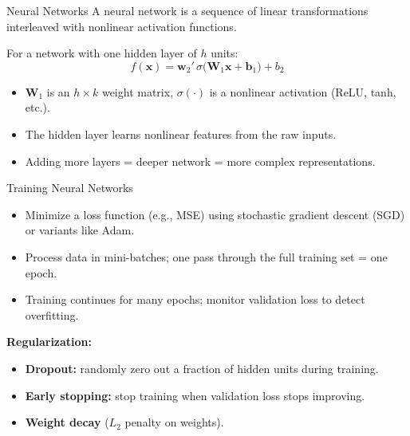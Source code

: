 \documentclass[aspectratio=169,t]{beamer}
\begin{document}
\begin{frame}{Neural Networks}
A neural network is a sequence of linear transformations interleaved with nonlinear \alert{activation functions}.
\vspace{0.3cm}

For a network with one hidden layer of $h$ units:
\[
f(\mathbf{x}) = \mathbf{w}_2' \,\sigma\!\bigl(\mathbf{W}_1 \mathbf{x} + \mathbf{b}_1\bigr) + b_2
\]

\begin{itemize}
\item $\mathbf{W}_1$ is an $h \times k$ weight matrix, $\sigma(\cdot)$ is a nonlinear activation (ReLU, tanh, etc.).
\item The hidden layer learns \alert{nonlinear features} from the raw inputs.
\item Adding more layers = deeper network = more complex representations.
\end{itemize}
\end{frame}

\begin{frame}{Training Neural Networks}
\begin{itemize}
\item Minimize a loss function (e.g., MSE) using \alert{stochastic gradient descent} (SGD) or variants like Adam.
\item Process data in \alert{mini-batches}; one pass through the full training set = one \alert{epoch}.
\item Training continues for many epochs; monitor validation loss to detect overfitting.
\end{itemize}

\vspace{0.3cm}
\textbf{Regularization:}
\begin{itemize}
\item \textbf{Dropout:} randomly zero out a fraction of hidden units during training.
\item \textbf{Early stopping:} stop training when validation loss stops improving.
\item \textbf{Weight decay} ($L_2$ penalty on weights).
\end{itemize}
\end{frame}
\end{document}
